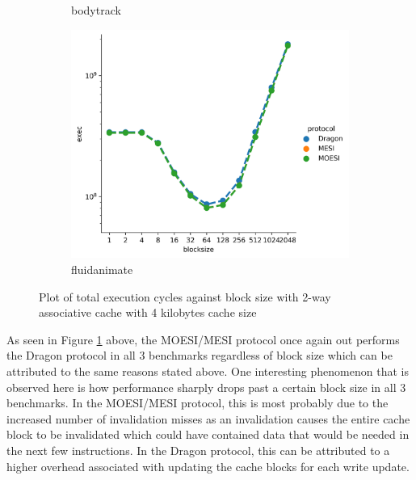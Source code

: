 \documentclass[nonacm,acmsmall,screen,11pt]{acmart}
\begin{document}
\begin{figure}[htb!]
\begin{subfigure}{0.32\textwidth}
    \caption{bodytrack}
  \end{subfigure}
  \begin{subfigure}{0.32\textwidth}
    \includegraphics[width=\columnwidth]{blocksize-fluidanimate}
    \caption{fluidanimate}
  \end{subfigure}
  \caption{Plot of total execution cycles against block size with 2-way associative cache with 4 kilobytes cache size}
  \label{fig:blocksize}
\end{figure}
As seen in Figure \ref{fig:blocksize} above, the MOESI/MESI protocol once again out performs the Dragon protocol in all 3 benchmarks regardless of block size which can be attributed to the same reasons stated above. One interesting phenomenon that is observed here is how performance sharply drops past a certain block size in all 3 benchmarks. In the MOESI/MESI protocol, this is most probably due to the increased number of invalidation misses as an invalidation causes the entire cache block to be invalidated which could have contained data that would be needed in the next few instructions. In the Dragon protocol, this can be attributed to a higher overhead associated with updating the cache blocks for each write update.
\end{document}
